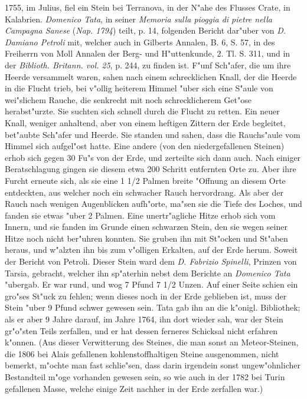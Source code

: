 \documentclass[a4paper, 11pt, oneside, polutonikogreek, german]{article}
\begin{document}
1755, im Julius, fiel ein Stein bei Terranova, in der N"ahe des Flusses Crate, in Kalabrien. \emph{Domenico Tata}, in seiner \emph{Memoria sulla pioggia di pietre nella Campagna Sanese} (\emph{Nap. 1794}) teilt, p. 14, folgenden Bericht dar"uber von \emph{D. Damiano Petroli} mit, welcher auch in Gilberts Annalen, B. 6, S. 57, in des Freiherrn von Moll Annalen der Berg- und H"uttenkunde, 2. Tl. S. 311, und in der \emph{Biblioth. Britann. vol. 25}, p. 244, zu finden ist. F"unf Sch"afer, die um ihre Heerde versammelt waren, sahen nach einem schrecklichen Knall, der die Heerde in die Flucht trieb, bei v"ollig heiterem Himmel "uber sich eine S"aule von wei"slichem Rauche, die senkrecht mit noch schrecklicherem Get"ose herabst"urzte. Sie suchten sich schnell durch die Flucht zu retten. Ein neuer Knall, weniger anhaltend, aber von einem heftigen Zittern der Erde begleitet, bet"aubte Sch"afer und Heerde. Sie standen und sahen, dass die Rauchs"aule vom Himmel sich aufgel"ost hatte. Eine andere (von den niedergefallenen Steinen) erhob sich gegen 30 Fu"s von der Erde, und zerteilte sich dann auch. Nach einiger Beratschlagung gingen sie diesem etwa 200 Schritt entfernten Orte zu. Aber ihre Furcht erneute sich, als sie eine 1 1/2 Palmen breite "Offnung an diesem Orte entdeckten, aus welcher noch ein schwacher Rauch hervordrang. Als aber der Rauch nach wenigen Augenblicken aufh"orte, ma"sen sie die Tiefe des Loches, und fanden sie etwas "uber 2 Palmen. Eine unertr"agliche Hitze erhob sich vom Innern, und sie fanden im Grunde einen schwarzen Stein, den sie wegen seiner Hitze noch nicht ber"uhren konnten. Sie gruben ihn mit St"ocken und St"aben heraus, und w"alzten ihn bis zum v"olligen Erkalten, auf der Erde herum. Soweit der Bericht von Petroli. Dieser Stein ward dem \emph{D. Fabrizio Spinelli}, Prinzen von Tarsia, gebracht, welcher ihn sp"aterhin nebst dem Berichte an \emph{Domenico Tata} "ubergab. Er war rund, und wog 7 Pfund 7 1/2 Unzen. Auf einer Seite schien ein gro"ses St"uck zu fehlen; wenn dieses noch in der Erde geblieben ist, muss der Stein "uber 9 Pfund schwer gewesen sein. Tata gab ihn an die k"onigl. Bibliothek; als er aber 9 Jahre darauf, im Jahre 1764, ihn dort wieder sah, war der Stein gr"o"sten Teils zerfallen, und er hat dessen ferneres Schicksal nicht erfahren k"onnen. (Aus dieser Verwitterung des Steines, die man sonst an Meteor-Steinen, die 1806 bei Alais gefallenen kohlenstoffhaltigen Steine ausgenommen, nicht bemerkt, m"ochte man fast schlie"sen, dass darin irgendein sonst ungew"ohnlicher Bestandteil m"oge vorhanden gewesen sein, so wie auch in der 1782 bei Turin gefallenen Masse, welche einige Zeit nachher in der Erde zerfallen war.)
\end{document}
